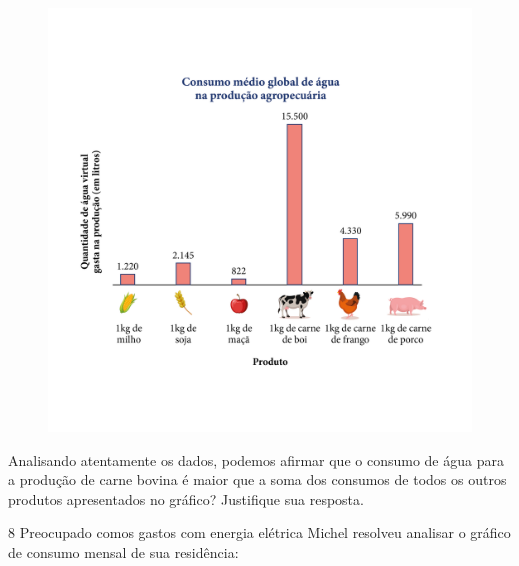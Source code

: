 \begin{figure}[htpb!]
\includegraphics[width=\textwidth]{../ilustracoes/MAT5/SAEB_5ANO_MAT_figura106.png}
\end{figure}

Analisando atentamente os dados, podemos afirmar que o consumo de água
para a produção de carne bovina é maior que a soma dos consumos de todos
os outros produtos apresentados no gráfico? Justifique sua resposta.



\num{8} Preocupado comos gastos com energia elétrica Michel resolveu
analisar o gráfico de consumo mensal de sua residência:


